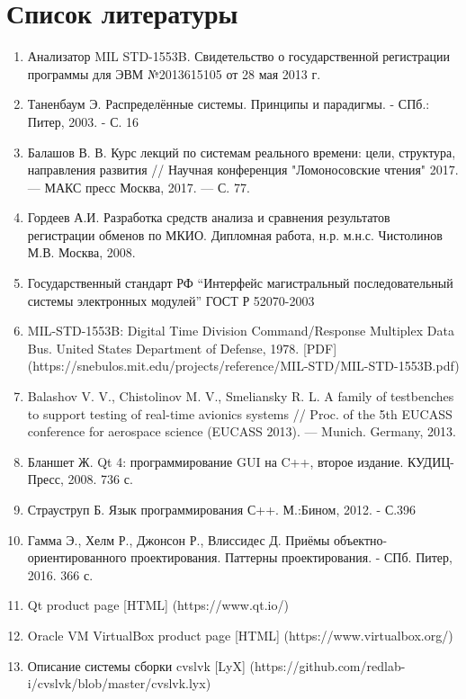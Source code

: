 \section*{Список литературы}

\begin{enumerate}
 \sloppy
 \item \label{opermon_reg} Анализатор MIL STD-1553B. Свидетельство о 
государственной регистрации программы для ЭВМ №2013615105 от 28 мая 2013 г.
 \item \label{tanenbaum} Таненбаум Э. Распределённые системы. Принципы и 
парадигмы. - СПб.: Питер, 2003. - С. 16
 \item \label{vius_rv_course} Балашов В. В. Курс лекций по системам реального 
времени: цели, структура, направления развития // Научная конференция 
"Ломоносовские чтения" 2017. — МАКС пресс Москва, 2017. — С. 77. 
 \item \label{gordeev_diploma} Гордеев А.И. Разработка средств анализа и 
сравнения результатов регистрации обменов по МКИО. Дипломная работа, н.р. 
м.н.с. Чистолинов М.В. Москва, 2008.
 \item \label{gost_r_52070-2003} Государственный стандарт РФ ``Интерфейс 
магистральный последовательный системы электронных модулей'' ГОСТ Р 52070-2003
 \item \label{mils} MIL-STD-1553B: Digital Time Division Command/Response 
Multiplex Data Bus. United States Department of Defense, 1978. [PDF] 
(https://snebulos.mit.edu/projects/reference/MIL-STD/MIL-STD-1553B.pdf)
 \item \label{stand3} Balashov V. V., Chistolinov M. V., Smeliansky R. L. A 
family of testbenches to support testing of real-time avionics systems // Proc. 
of the 5th EUCASS conference for aerospace science (EUCASS 2013). — Munich. 
Germany, 2013. 
 \item \label{blanshet_qt4} Бланшет Ж. Qt 4: программирование GUI на C++, 
второе издание. КУДИЦ-Пресс, 2008. 736 с.
 \item \label{straustrup} Страуструп Б. Язык программирования С++. М.:Бином, 
2012. - С.396
 \item \label{gof} Гамма Э., Хелм Р., Джонсон Р., Влиссидес Д. Приёмы 
объектно-ориентированного проектирования. Паттерны проектирования. - СПб. 
Питер, 2016. 366 с.
 \item \label{qt_ref} Qt product page [HTML] (https://www.qt.io/)
 \item \label{virtualbox} Oracle VM VirtualBox product page [HTML] 
(https://www.virtualbox.org/)
 \item \label{cvslvk} Описание системы сборки cvslvk [LyX] 
(https://github.com/redlab-i/cvslvk/blob/master/cvslvk.lyx)
\end{enumerate}
